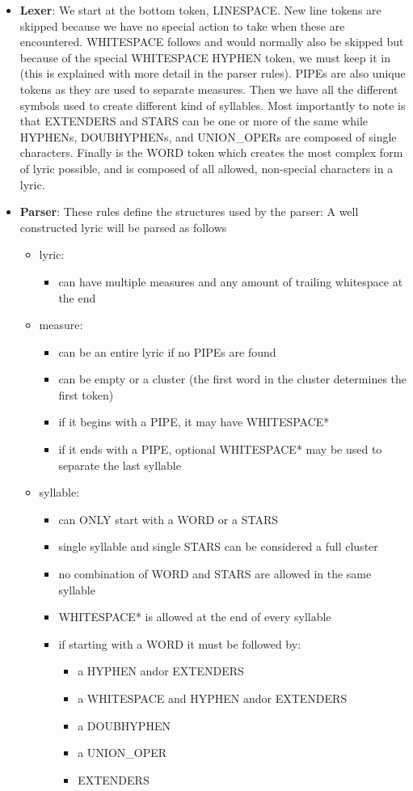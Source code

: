 \documentclass[12pt]{book}
\begin{document}
\begin{itemize}
\item {\bf Lexer}: We start at the bottom token, LINESPACE. New line tokens are skipped because we have no special action to take when these are encountered. WHITESPACE follows and would normally also be skipped but because of the special WHITESPACE HYPHEN token, we must keep it in (this is explained with more detail in the parser rules). PIPEs are also unique tokens as they are used to separate measures. Then we have all the different symbols used to create different kind of syllables. Most importantly to note is that EXTENDERS and STARS can be one or more of the same while HYPHENs, DOUBHYPHENs, and UNION\_OPERs are composed of single characters. Finally is the WORD token which creates the most complex form of lyric possible, and is composed of all allowed, non-special characters in a lyric.

\item {\bf Parser}:
These rules define the structures used by the parser:
A well constructed lyric will be parsed as follows
\begin{itemize} 
\item lyric:
\begin{itemize}
\item can have multiple measures and any amount of trailing whitespace at the end
\end{itemize}
\item measure:
\begin{itemize}
\item can be an entire lyric if no PIPEs are found
\item can be empty or a cluster (the first word in the cluster determines the first token)
\item if it begins with a PIPE, it may have WHITESPACE*
\item if it ends with a PIPE, optional WHITESPACE* may be used to separate the last syllable
\end{itemize}
\item syllable:
\begin{itemize} 
\item can ONLY start with a WORD or a STARS
\item single syllable and single STARS can be considered a full cluster
\item no combination of WORD and STARS are allowed in the same syllable
\item WHITESPACE* is allowed at the end of every syllable
\item if starting with a WORD it must be followed by:
\begin{itemize}
\item a HYPHEN and\/or EXTENDERS
\item a WHITESPACE and HYPHEN and\/or EXTENDERS
\item a DOUBHYPHEN
\item a UNION\_OPER
\item EXTENDERS
\end{itemize}
\end{itemize}
\end{itemize}


\end{itemize}
\end{document}
